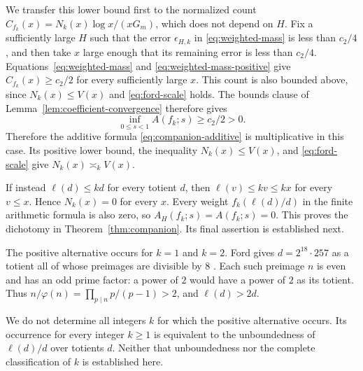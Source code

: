 We transfer this lower bound first to the normalized count
\(C_{f_k}(x)=N_k(x)\log x/(xG_m)\), which does not depend on \(H\).
Fix a sufficiently large \(H\) such that the error
\(\epsilon_{H,k}\) in \eqref{eq:weighted-mass} is less than \(c_2/4\),
and then take \(x\) large enough that its remaining error is less
than \(c_2/4\).  Equations~\eqref{eq:weighted-mass} and
\eqref{eq:weighted-mass-positive} give
\(C_{f_k}(x)\geq c_2/2\) for every sufficiently large \(x\).
This count is also bounded above, since \(N_k(x)\leq V(x)\) and
\eqref{eq:ford-scale} holds.  The bounds clause of
Lemma~\ref{lem:coefficient-convergence} therefore gives
\[
 \inf_{0\leq s<1}A(f_k;s)\geq c_2/2>0.
\]
Therefore the additive formula \eqref{eq:companion-additive} is
multiplicative in this case.  Its positive lower bound, the inequality
\(N_k(x)\leq V(x)\), and \eqref{eq:ford-scale} give
\(N_k(x)\asymp_k V(x)\).

If instead \(\ell(d)\leq kd\) for every totient \(d\), then
\(\ell(v)\leq kv\leq kx\) for every \(v\leq x\).  Hence
\(N_k(x)=0\) for every \(x\).  Every weight
\(f_k(\ell(d)/d)\) in the finite arithmetic formula is also zero,
so \(A_H(f_k;s)=A(f_k;s)=0\).  This proves the dichotomy in Theorem~\ref{thm:companion}.
Its final assertion is established next.

\begin{remark}\label{rem:least-preimage-scope}
The positive alternative occurs for \(k=1\) and \(k=2\).  Ford gives
\(d=2^{18}\cdot257\) as a totient all of whose preimages are divisible
by \(8\) \cite[Section~7.3, p.~39]{FordTotients2013}.  Each such
preimage \(n\) is even and has an odd prime factor: a power of \(2\)
would have a power of \(2\) as its totient.  Thus
\(n/\varphi(n)=\prod_{p\mid n}p/(p-1)>2\), and \(\ell(d)>2d\).

We do not determine all integers \(k\) for which the positive
alternative occurs.  Its occurrence for every integer \(k\geq1\)
is equivalent to the unboundedness of \(\ell(d)/d\) over totients
\(d\).  Neither that unboundedness nor the complete classification
of \(k\) is established here.
\end{remark}
